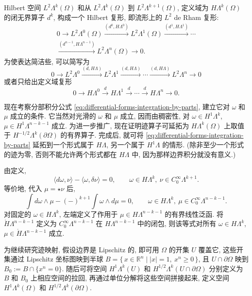 {Hilbert 空间 $L^2\Lambda^k(\Omega)$ 和从 $L^2\Lambda^k(\Omega)$ 到 $L^2\Lambda^{k+1}(\Omega)$, 定义域为 $H\Lambda^k(\Omega)$ 的闭无界算子 $d^k$, 构成一个 Hilbert 复形, 即流形上的 $L^2$ de Rham 复形:}
\[
\begin{gathered}
0\to L^2\Lambda^0(\Omega)\xrightarrow{(d^0,H\Lambda^0)}L^2\Lambda^1(\Omega)\xrightarrow{(d^1,H\Lambda^1)}\cdots\\
\xrightarrow{(d^{n-1},H\Lambda^{n-1})}L^2\Lambda^n(\Omega)\to0.
\end{gathered}
\]
{为使表达简洁些, 可以简写为}
\begin{equation}\label{eq:l2-manifold-de-rham-complex}
0\to L^2\Lambda^0\xrightarrow{(d,H\Lambda)}L^2\Lambda^1\xrightarrow{(d,H\Lambda)}\cdots\xrightarrow{(d,H\Lambda)}L^2\Lambda^n\to0
\end{equation}
{或者只给出定义域复形}
\begin{equation}\label{eq:manifold-de-rham-domain-complex}
0\to H\Lambda^0\xrightarrow{d}H\Lambda^1\xrightarrow{d}\cdots\xrightarrow{d}H\Lambda^n\to0.
\end{equation}

{现在考察分部积分公式 \eqref{eq:differential-forms-integration-by-parts}, 建立它对 $\omega$ 和 $\mu$ 成立的条件. 它当然对光滑的 $\omega$ 和 $\mu$ 成立, 因而由稠密性, 对 $\omega\in H^1\Lambda^k$, $\mu\in H^1\Lambda^{n-k-1}$ 成立. 为进一步推广, 现在证明迹算子可延拓为 $H\Lambda^k(\Omega)$ 上取值于 $H^{-1/2}\Lambda^k(\partial\Omega)$ 的有界算子. 完成后, 就可将 \eqref{eq:differential-forms-integration-by-parts} 延拓到一个形式属于 $H\Lambda$, 另一个属于 $H^1\Lambda$ 的情形. (除非至少一个形式的迹为零, 否则不能允许两个形式都在 $H\Lambda$ 中, 因为那样边界积分就没有意义.)}

{由定义,}
\[
\langle d\omega,\nu\rangle-\langle\omega,\delta\nu\rangle=0,\qquad\omega\in H\Lambda^k,\ \nu\in C_0^\infty\Lambda^{k+1}.
\]
{等价地, 代入 $\mu=\star\nu$ 后,}
\[
\int d\omega\wedge\mu-(-)^{k+1}\int\omega\wedge d\mu=0,\qquad\omega\in H\Lambda^k,\ \mu\in C_0^\infty\Lambda^{n-k-1}.
\]
{对固定的 $\omega\in H\Lambda^k$, 左端定义了作用于 $\mu\in H\Lambda^{n-k-1}$ 的有界线性泛函. 将 $\mathring H\Lambda^{n-k-1}$ 定义为 $C_0^\infty\Lambda^{n-k-1}$ 在 $H\Lambda^{n-k-1}$ 中的闭包, 则该等式对所有 $\omega\in H\Lambda^k$, $\mu\in\mathring H\Lambda^{n-k-1}$ 成立.}

{为继续研究迹映射, 假设边界是 Lipschitz 的, 即可用 $\Omega$ 的开集 $U$ 覆盖它, 这些开集通过 Lipschitz 坐标图映到半球 $B=\{\,x\in\mathbb R^n\mid|x|=1,\ x^n\geq0\,\}$, 且 $U\cap\partial\Omega$ 映到 $B_0:=B\cap\{x^n=0\}$. 随后可将空间 $H^1\Lambda^k(U)$ 和 $H^{1/2}\Lambda^k(U\cap\partial\Omega)$ 分别定义为 $B$ 和 $B_0$ 上相应空间的拉回, 再通过单位分解将这些空间拼接起来, 定义空间 $H^1\Lambda^k(\Omega)$ 和 $H^{1/2}\Lambda^k(\partial\Omega)$.}


